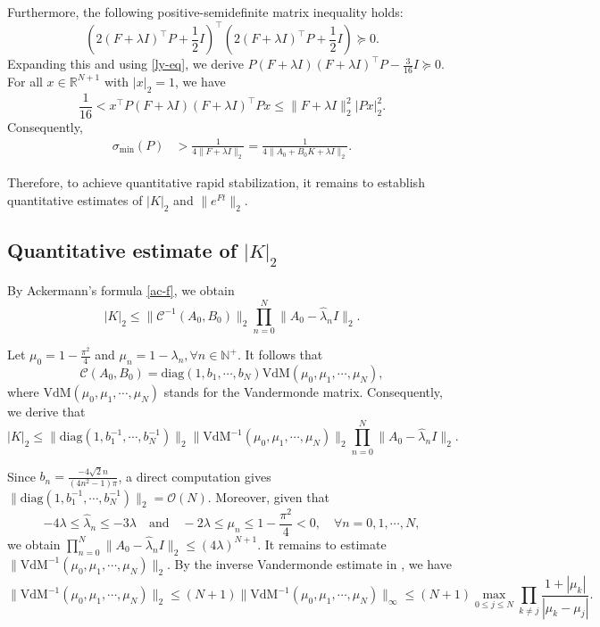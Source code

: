 \documentclass[a4paper]{article}
\numberwithin{equation}{section}
\begin{document}
Furthermore, the following positive-semidefinite matrix inequality holds:
\begin{equation*}
	\left(2(F+\lambda I)^{\top}P+\frac{1}{2}I\right)^{\top}\left(2(F+\lambda I)^{\top}P+\frac{1}{2}I\right)\succeq 0.
\end{equation*}
Expanding this and using \eqref{ly-eq}, we derive $P(F+\lambda I)(F+\lambda I)^{\top}P-\frac{3}{16}I\succeq 0$. For all $x\in \mathbb R^{N+1}$ with $|x|_2=1$, we have
\begin{equation*}
	\frac{1}{16}< x^\top P(F+\lambda I)(F+\lambda I)^{\top}Px\le \|F+\lambda I\|_2^2|Px|_2^2.
\end{equation*}
Consequently,
\begin{equation}\label{P-min}
\begin{aligned}
\sigma_{\min}(P)&> \frac{1}{4\|F+\lambda I\|_2}=\frac{1}{4\|A_0+B_0K+\lambda I\|_2}.
\end{aligned}
\end{equation}

Therefore, to achieve quantitative rapid stabilization, it remains to establish quantitative estimates of $|K|_2$ and $\|e^{Ft}\|_2$.

\subsection{Quantitative estimate of $|K|_2$}
By Ackermann's formula \eqref{ac-f}, we obtain
\begin{equation*}
|K|_2\le \|\mathcal{C}^{-1}(A_0,B_0)\|_2\prod\limits_{n=0}^N\|A_0-\hat{\lambda}_nI\|_2.
\end{equation*}

Let $\mu_0=1-\frac{\pi^2}{4}$ and $ \mu_n=1-\lambda_n,\forall n\in\mathbb{N}^+.$ It follows that $$\mathcal{C}(A_0,B_0)=\text{diag}(1,b_1,\cdots,b_N)\text{VdM}(\mu_0,\mu_1,\cdots,\mu_N),$$ where $\text{VdM}(\mu_0,\mu_1,\cdots,\mu_N)$ stands for the Vandermonde matrix. 
Consequently, we derive that
\begin{equation*}
|K|_2\le \|\text{diag}(1,b^{-1}_1,\cdots,b^{-1}_N)\|_2\|\text{VdM}^{-1}(\mu_0,\mu_1,\cdots,\mu_N)\|_2\prod\limits_{n=0}^N\|A_0-\hat{\lambda}_nI\|_2.
\end{equation*}

Since $b_n=\frac{-4\sqrt{2}n}{(4n^2-1)\pi}$, a direct computation gives $\|\text{diag}(1,b^{-1}_1,\cdots,b^{-1}_N)\|_2=\mathcal{O}(N)$. Moreover, given that $$-4\lambda\le \hat{\lambda}_n\le -3\lambda \quad\text{and} \quad-2\lambda\le\mu_n\le 1-\frac{\pi^2}{4}<0,\quad  \forall n=0,1,\cdots,N,$$ we obtain
$\prod\limits_{n=0}^N\|A_0-\hat{\lambda}_nI\|_2\le (4\lambda)^{N+1}$.
It remains to estimate $\|\text{VdM}^{-1}(\mu_0,\mu_1,\cdots,\mu_N)\|_2$. By the inverse Vandermonde estimate in \cite{WG}, we have
\begin{equation}\label{V-est}
\|\text{VdM}^{-1}(\mu_0,\mu_1,\cdots,\mu_N)\|_2\le (N+1)\|\text{VdM}^{-1}(\mu_0,\mu_1,\cdots,\mu_N)\|_{\infty}\le (N+1)\max_{0\le j\le N}\prod_{k\neq j}\frac{1+|\mu_k|}{|\mu_k-\mu_j|}.
\end{equation}
\end{document}
